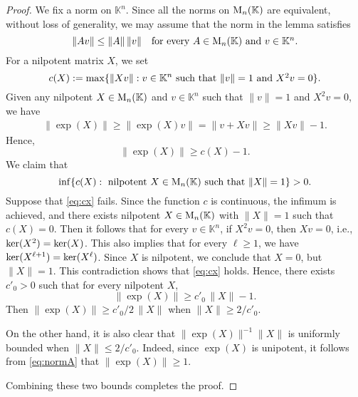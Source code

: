 \documentclass[11pt,reqno,a4paper]{amsart}
\numberwithin{equation}{section}
\theoremstyle{theorem}
\theoremstyle{definition}
\begin{document}
\begin{proof}
We fix a norm on $\mathbb{K}^n$. 
Since all the norms on $\hbox{\rm M}_n(\mathbb{K})$ are equivalent,
without loss of generality, we may assume that the norm in the lemma satisfies
\begin{equation}
\label{eq:normA}
\|Av\|\le \|A\|\, \|v\|\quad 
\hbox{for every $A\in \hbox{\rm M}_n(\mathbb{K})$ and $v\in \mathbb{K}^n$.}
\end{equation}
For a nilpotent matrix $X$, we set
$$
c(X):=\max\{\|Xv\|: v\in \mathbb{K}^n \hbox{ such that $\|v\|=1$ and $X^2v=0$} \}.
$$
Given any nilpotent $X\in \hbox{\rm M}_n(\mathbb{K})$
and $v\in \mathbb{K}^n$ such that $\|v\|=1$ and $X^2v=0$,
we have
\begin{align*}
\|\exp(X)\|\ge \|\exp(X)v\|= \|v+ X v\|\ge \|Xv\|-1.
\end{align*}
Hence, 
$$
\|\exp(X)\|\ge c(X)-1.
$$
We claim that
\begin{equation}
\label{eq:cx}
\inf\{c(X): \hbox{ nilpotent $X\in \hbox{\rm M}_n(\mathbb{K})$ such that 
	$\|X\|=1$}\}>0.
\end{equation}
Suppose that \eqref{eq:cx} fails. Since the function $c$ is continuous,
the infimum is achieved, and there exists nilpotent 
$X\in \hbox{\rm M}_n(\mathbb{K})$ with $\|X\|=1$ such that $c(X)=0$.
Then it follows that for every $v\in\mathbb{K}^n$, if
$X^2v=0$, then $Xv=0$, i.e., $\hbox{ker}(X^2)=\hbox{ker}(X)$.
This also implies that for every $\ell\ge 1$, we have
$\hbox{ker}(X^{\ell+1})=\hbox{ker}(X^\ell)$.
Since $X$ is nilpotent, we conclude that $X=0$,
but $\|X\|=1$. This contradiction shows that \eqref{eq:cx} holds.
Hence, there exists $c'_0>0$ such that for every nilpotent $X$,
$$
\|\exp(X)\|\ge c'_0\,\|X\|-1.
$$
Then $\|\exp(X)\|\ge c'_0/2\,\|X\|$ when $\|X\|\ge 2/c'_0$.

On the other hand, it is also clear that 
$\|\exp(X)\|^{-1} \|X\|$ is uniformly bounded when
$\|X\|\le 2/c'_0$. Indeed, since $\exp(X)$ is unipotent,
it follows from \eqref{eq:normA} that $\|\exp(X)\|\ge 1$.

Combining these two bounds completes the proof.
\end{proof}
\end{document}
